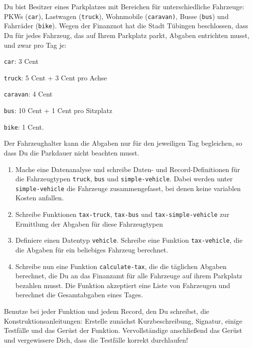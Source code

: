 \begin{aufgabe}
   Du bist Besitzer eines Parkplatzes mit
  Bereichen für unterschiedliche Fahrzeuge:  PKWs (\lstinline{car}), Lastwagen
  (\lstinline{truck}), Wohnmobile (\lstinline{caravan)}, Busse (\lstinline{bus})
  und Fahrräder (\lstinline{bike}). 
  Wegen der Finanznot hat die Stadt Tübingen beschlossen, dass 
  Du für jedes Fahrzeug, das auf Ihrem Parkplatz
  parkt, Abgaben entrichten musst, und zwar pro Tag je:
  \begin{list}{-}{}
  \item \lstinline{car}: 3 Cent
  \item \lstinline{truck}: 5 Cent + 3 Cent pro Achse
  \item \lstinline{caravan}: 4 Cent
  \item \lstinline{bus}: 10 Cent + 1 Cent pro Sitzplatz
  \item \lstinline{bike}: 1 Cent.
  \end{list} 
  Der Fahrzeughalter kann die Abgaben nur für den jeweiligen Tag begleichen, 
  so dass Du die Parkdauer nicht beachten musst.

  \begin{enumerate}
  \item Mache eine Datenanalyse und schreibe Daten- und 
    Record-Definitionen für die Fahrzeugtypen \lstinline{truck}, \lstinline{bus} und
    \lstinline{simple-vehicle}. Dabei werden unter \lstinline{simple-vehicle} die
    Fahrzeuge zusammengefasst, bei denen keine variablen Kosten anfallen.
  \item Schreibe  Funktionen
    \lstinline{tax-truck}, \lstinline{tax-bus} und \lstinline{tax-simple-vehicle}
    zur Ermittlung der Abgaben für diese Fahrzeugtypen
  \item Definiere einen Datentyp \lstinline{vehicle}. Schreibe eine
    Funktion \lstinline{tax-vehicle}, die die Abgaben für ein beliebiges Fahrzeug 
    berechnet.    
  \item Schreibe nun eine Funktion \lstinline{calculate-tax}, die die täglichen 
    Abgaben berechnet, die Du an das Finanzamt für alle Fahrzeuge auf ihrem Parkplatz
    bezahlen musst. Die Funktion akzeptiert eine Liste von Fahrzeugen und
    berechnet die Gesamtabgaben eines Tages.
  \end{enumerate}
  Benutze bei jeder Funktion und jedem Record, den Du schreibst,
  die Konstruktionsanleitungen: Erstelle zunächst
  Kurzbeschreibung, Signatur, einige Testfälle und das Gerüst der Funktion.
  Vervollständige anschließend das Gerüst und vergewissere Dich,
  dass die Testfälle korrekt durchlaufen!
\end{aufgabe}

